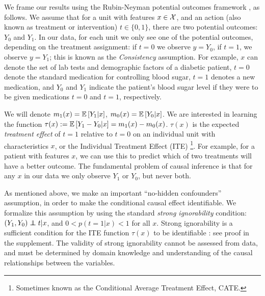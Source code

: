 We frame our results using the Rubin-Neyman potential outcomes framework \cite{rubin2011causal}, as follows. We assume that for a unit with features $x \in \mathcal X$, and an action (also known as treatment or intervention) $t \in \{0,1\}$, there are two potential outcomes: $Y_0$ and $Y_1$. In our data, for each unit we only see one of the potential outcomes, depending on the treatment assignment: if $t=0$ we observe $y=Y_0$, if $t=1$, we observe $y=Y_1$; this is known as the \emph{Consistency} assumption. For example, $x$ can denote the set of lab tests and demographic factors of a diabetic patient, $t=0$ denote the standard medication for controlling blood sugar, $t=1$ denotes a new medication, and $Y_0$ and $Y_1$ indicate the patient's blood sugar level if they were to be given medications $t=0$ and $t=1$, respectively.

We will denote $m_1(x) = \mathbb{E}\left[Y_1|x\right]$, $m_0(x) = \mathbb{E}\left[Y_0|x\right]$.
We are interested in learning the function $\tau(x) := \mathbb{E} \left[Y_1 -Y_0|x\right] = m_1(x) - m_0(x)$. $\tau(x)$ is the expected \emph{treatment effect} of $t=1$ relative to $t=0$ on an individual unit with characteristics $x$, or the Individual Treatment Effect (ITE) \footnote{Sometimes known as the Conditional Average Treatment Effect, CATE.}. For example, for a patient with features $x$, we can use this to predict which of two treatments will have a better outcome. The fundamental problem of causal inference is that for any $x$ in our data we only observe $Y_1$ or $Y_0$, but never both. %

As mentioned above, we make an important ``no-hidden confounders'' assumption, in order to make the conditional causal effect identifiable. We formalize this assumption by using the standard \emph{strong ignorability} condition: $(Y_1, Y_0)\indep t | x $, and $0<p(t=1|x)<1$ for all $x$. Strong ignorability is a sufficient condition for the ITE function $\tau(x)$ to be identifiable \cite{imbens2009recent,pearl2015detecting,rolling2014estimation}: see proof in the supplement. The validity of strong ignorability cannot be assessed from data, and must be determined by domain knowledge and understanding of the causal relationships between the variables.

